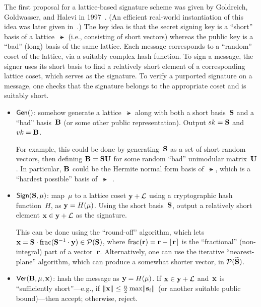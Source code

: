 \documentclass[11pt]{article}
\begin{document}
The first proposal for a lattice-based signature scheme was given by
Goldreich, Goldwasser, and Halevi in
1997~\cite{DBLP:conf/crypto/GoldreichGH97a}. (An efficient real-world
instantiation of this idea was later given
in~\cite{DBLP:conf/ctrsa/HoffsteinHPSW03}.) The key idea is that the
secret signing key is a ``short'' basis of a lattice~$\lat$ (i.e.,
consisting of short vectors) whereas the public key is a ``bad''
(long) basis of the same lattice. Each message corresponds to a
``random'' coset of the lattice, via a suitably complex hash function.
To sign a message, the signer uses its short basis to find a
relatively short element of a corresponding lattice coset, which
serves as the signature. To verify a purported signature on a message,
one checks that the signature belongs to the appropriate coset and is
suitably short.

\begin{itemize}
\item $\mathsf{Gen}()$: somehow generate a lattice~$\lat$ along with both a
  short basis~$\mathbf{S}$ and a ``bad'' basis~$\mathbf{B}$ (or some other
  public representation). Output $sk=\mathbf{S}$ and $vk=\mathbf{B}$.

  For example, this could be done by generating~$\mathbf{S}$ as a set of
  short random vectors, then defining $\mathbf{B}=\mathbf{S} \mathbf{U}$ for some
  random ``bad'' unimodular matrix~$\mathbf{U}$. In particular, $\mathbf{B}$
  could be the Hermite normal form basis of~$\lat$, which is a
  ``hardest possible'' basis
  of~$\lat$~\cite{DBLP:conf/calc/Micciancio01}.
  
\item $\mathsf{Sign}(\mathbf{S}, \mu)$: map~$\mu$ to a lattice coset $\mathbf{y}+\mathcal{L}$
  using a cryptographic hash function~$H$, as $\mathbf{y} = H(\mu)$. Using
  the short basis~$\mathbf{S}$, output a relatively short element
  $\mathbf{x} \in \mathbf{y} + \mathcal{L}$ as the signature.

  This can be done using the ``round-off'' algorithm, which lets
  $\mathbf{x} = \mathbf{S} \cdot \text{frac}(\mathbf{S}^{-1} \cdot \mathbf{y}) \in
  \mathcal{P}(\mathbf{S})$, where $\text{frac}(\mathbf{r}) = \mathbf{r} - \lfloor\mathbf{r}\rceil$
  is the ``fractional'' (non-integral) part of a vector~$\mathbf{r}$.
  Alternatively, one can use the iterative ``nearest-plane''
  algorithm, which can produce a somewhat shorter vector, in
  $\mathcal{P}(\widetilde{\mathbf{S}})$.
    
\item $\mathsf{Ver}(\mathbf{B}, \mu, \mathbf{x})$: hash the message as
  $\mathbf{y} = H(\mu)$. If $\mathbf{x} \in \mathbf{y}+\mathcal{L}$ and~$\mathbf{x}$ is
  ``sufficiently short''---e.g., if
  $\lVert\mathbf{x}\rVert \leq \frac{n}{2} \max \lVert\mathbf{s}_i\rVert$ (or another
  suitable public bound)---then accept; otherwise, reject.
\end{itemize}
\end{document}

